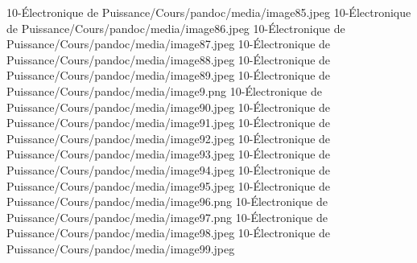 10-Électronique de Puissance/Cours/pandoc/media/image85.jpeg 10-Électronique de Puissance/Cours/pandoc/media/image86.jpeg 10-Électronique de Puissance/Cours/pandoc/media/image87.jpeg 10-Électronique de Puissance/Cours/pandoc/media/image88.jpeg 10-Électronique de Puissance/Cours/pandoc/media/image89.jpeg 10-Électronique de Puissance/Cours/pandoc/media/image9.png 10-Électronique de Puissance/Cours/pandoc/media/image90.jpeg 10-Électronique de Puissance/Cours/pandoc/media/image91.jpeg 10-Électronique de Puissance/Cours/pandoc/media/image92.jpeg 10-Électronique de Puissance/Cours/pandoc/media/image93.jpeg 10-Électronique de Puissance/Cours/pandoc/media/image94.jpeg 10-Électronique de Puissance/Cours/pandoc/media/image95.jpeg 10-Électronique de Puissance/Cours/pandoc/media/image96.png 10-Électronique de Puissance/Cours/pandoc/media/image97.png 10-Électronique de Puissance/Cours/pandoc/media/image98.jpeg 10-Électronique de Puissance/Cours/pandoc/media/image99.jpeg
